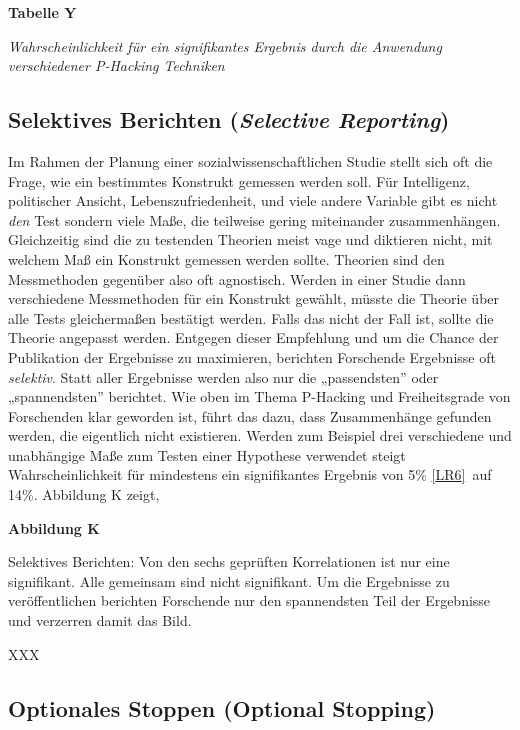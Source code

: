 \documentclass[
  letterpaper,
  DIV=11,
  numbers=noendperiod]{scrreprt}
\begin{document}
\textbf{Tabelle Y}

\emph{Wahrscheinlichkeit für ein signifikantes Ergebnis durch die
Anwendung verschiedener P-Hacking Techniken}

\subsection{\texorpdfstring{Selektives Berichten (\emph{Selective
Reporting})}{Selektives Berichten (Selective Reporting)}}\label{selektives-berichten-selective-reporting}

Im Rahmen der Planung einer sozialwissenschaftlichen Studie stellt sich
oft die Frage, wie ein bestimmtes Konstrukt gemessen werden soll. Für
Intelligenz, politischer Ansicht, Lebenszufriedenheit, und viele andere
Variable gibt es nicht \emph{den} Test sondern viele Maße, die teilweise
gering miteinander zusammenhängen. Gleichzeitig sind die zu testenden
Theorien meist vage und diktieren nicht, mit welchem Maß ein Konstrukt
gemessen werden sollte. Theorien sind den Messmethoden gegenüber also
oft agnostisch. Werden in einer Studie dann verschiedene Messmethoden
für ein Konstrukt gewählt, müsste die Theorie über alle Tests
gleichermaßen bestätigt werden. Falls das nicht der Fall ist, sollte die
Theorie angepasst werden. Entgegen dieser Empfehlung und um die Chance
der Publikation der Ergebnisse zu maximieren, berichten Forschende
Ergebnisse oft \emph{selektiv}. Statt aller Ergebnisse werden also nur
die „passendsten'' oder „spannendsten'' berichtet. Wie oben im Thema
P-Hacking und Freiheitsgrade von Forschenden klar geworden ist, führt
das dazu, dass Zusammenhänge gefunden werden, die eigentlich nicht
existieren. Werden zum Beispiel drei verschiedene und unabhängige Maße
zum Testen einer Hypothese verwendet steigt Wahrscheinlichkeit für
mindestens ein signifikantes Ergebnis von 5\%
\hyperref[_msocom_6]{{[}LR6{]}}~auf 14\%. Abbildung K zeigt,

\textbf{Abbildung K}

Selektives Berichten: Von den sechs geprüften Korrelationen ist nur eine
signifikant. Alle gemeinsam sind nicht signifikant. Um die Ergebnisse zu
veröffentlichen berichten Forschende nur den spannendsten Teil der
Ergebnisse und verzerren damit das Bild.

XXX

\subsection{Optionales Stoppen (Optional
Stopping)}\label{optionales-stoppen-optional-stopping}
\end{document}
